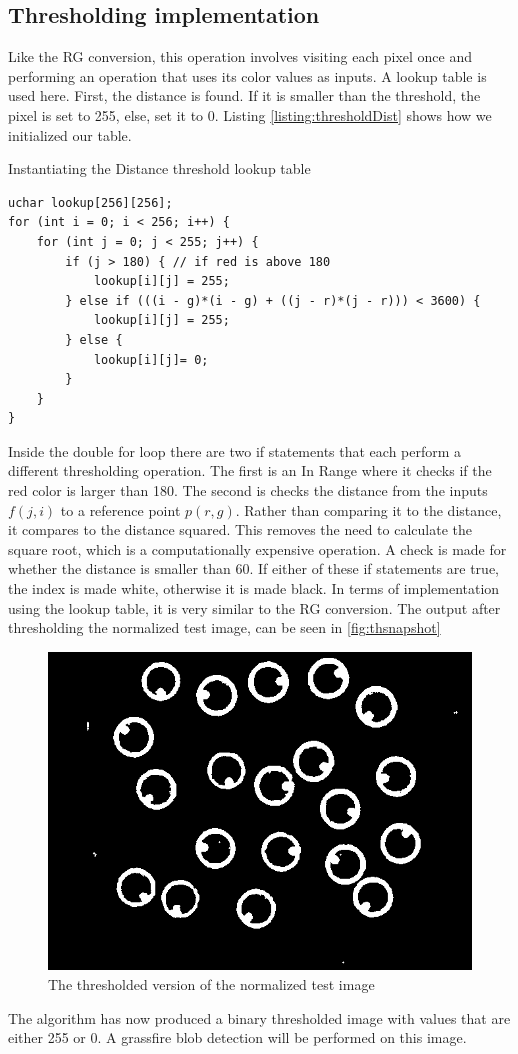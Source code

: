 {\subsection{Thresholding implementation}
Like the RG conversion, this operation involves visiting each pixel once and performing an operation that uses its color values as inputs. A lookup table is used here. First, the distance is found. If it is smaller than the threshold, the pixel is set to 255, else, set it to 0. Listing \ref{listing:thresholdDist} shows how we initialized our table.

\begin{listing}[H]
	\caption{Instantiating the Distance threshold lookup table}
	\label{listing:thresholdDist}
	\begin{verbatim}
uchar lookup[256][256];
for (int i = 0; i < 256; i++) {
	for (int j = 0; j < 255; j++) {
		if (j > 180) { // if red is above 180
			lookup[i][j] = 255;
		} else if (((i - g)*(i - g) + ((j - r)*(j - r))) < 3600) {
			lookup[i][j] = 255;
		} else {
			lookup[i][j]= 0;
		}
	}
}
\end{verbatim}
\end{listing}

Inside the double for loop there are two if statements that each perform a different thresholding operation. The first is an In Range where it checks if the red color is larger than 180. The second is checks the distance from the inputs $f(j,i)$ to a reference point $p(r,g)$. Rather than comparing it to the distance, it compares to the distance squared. This removes the need to calculate the square root, which is a computationally expensive operation. A check is made for whether the distance is smaller than 60. If either of these if statements are true, the index is made white, otherwise it is made black.
In terms of implementation using the lookup table, it is very similar to the RG conversion. The output after thresholding the normalized test image, can be seen in \autoref{fig:thsnapshot}\\
\begin{figure}[H]
	\centering
	\includegraphics[width=0.6\linewidth]{figure/Analysis/thresholded.png}
	\caption{The thresholded version of the normalized test image}
	\label{fig:thsnapshot}
\end{figure} 
The algorithm has now produced a binary thresholded image with values that are either 255 or 0. A grassfire blob detection will be performed on this image. 
}
